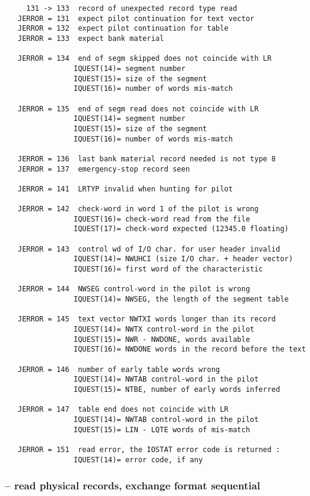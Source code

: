 \begin{verbatim}
     131 -> 133  record of unexpected record type read
   JERROR = 131  expect pilot continuation for text vector
   JERROR = 132  expect pilot continuation for table
   JERROR = 133  expect bank material

   JERROR = 134  end of segm skipped does not coincide with LR
                IQUEST(14)= segment number
                IQUEST(15)= size of the segment
                IQUEST(16)= number of words mis-match

   JERROR = 135  end of segm read does not coincide with LR
                IQUEST(14)= segment number
                IQUEST(15)= size of the segment
                IQUEST(16)= number of words mis-match

   JERROR = 136  last bank material record needed is not type 8
   JERROR = 137  emergency-stop record seen

   JERROR = 141  LRTYP invalid when hunting for pilot

   JERROR = 142  check-word in word 1 of the pilot is wrong
                IQUEST(16)= check-word read from the file
                IQUEST(17)= check-word expected (12345.0 floating)

   JERROR = 143  control wd of I/O char. for user header invalid
                IQUEST(14)= NWUHCI (size I/O char. + header vector)
                IQUEST(16)= first word of the characteristic

   JERROR = 144  NWSEG control-word in the pilot is wrong
                IQUEST(14)= NWSEG, the length of the segment table

   JERROR = 145  text vector NWTXI words longer than its record
                IQUEST(14)= NWTX control-word in the pilot
                IQUEST(15)= NWR - NWDONE, words available
                IQUEST(16)= NWDONE words in the record before the text

   JERROR = 146  number of early table words wrong
                IQUEST(14)= NWTAB control-word in the pilot
                IQUEST(15)= NTBE, number of early words inferred

   JERROR = 147  table end does not coincide with LR
                IQUEST(14)= NWTAB control-word in the pilot
                IQUEST(15)= LIN - LQTE words of mis-match

   JERROR = 151  read error, the IOSTAT error code is returned :
                IQUEST(14)= error code, if any
\end{verbatim}

\subsubsection*{ -- read physical records, exchange format sequential}

